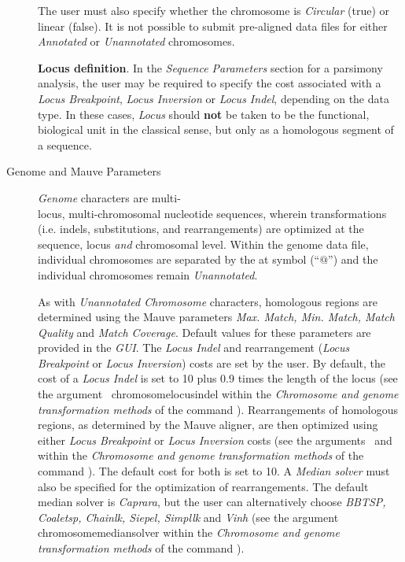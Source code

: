 \begin{description}
		\indent The user must also specify whether the chromosome is \emph{Circular} (true) or linear (false).
		It is not possible to submit pre-aligned data files for either \emph{Annotated} or \emph{Unannotated} 
		chromosomes. 
			
\begin{statement}
    \textbf{Locus definition}. In the \emph{Sequence Parameters} section for a parsimony analysis, the user may be required 
	to specify the cost associated with a \emph{Locus Breakpoint}, \emph{Locus Inversion} or 
	\emph{Locus Indel}, depending on the data type. In these cases, \emph{Locus} should \textbf{not} 
	be taken to be the functional, biological unit in the classical sense, 	but only as a homologous 
	segment of a sequence.
\end{statement}
	
	\item [Genome and Mauve Parameters] \emph{Genome} characters are multi- \\locus, multi-chromosomal nucleotide 
		sequences, wherein transformations (i.e. indels, substitutions, and rearrangements) are optimized 
		at the sequence, locus \emph{and} chromosomal level.  Within the genome data file, individual 
		chromosomes are separated by the at symbol (``$@$'') and the individual chromosomes remain 
		\emph{Unannotated}. 
		
		\indent As with \emph{Unannotated Chromosome} characters, homologous regions are determined 
		using the Mauve parameters \emph{Max. Match, Min. Match, Match Quality} and 
		\emph {Match Coverage}. Default values for these parameters are provided in the \emph{GUI}.
		The \emph{Locus Indel} and rearrangement (\emph{Locus Breakpoint} or \emph{Locus Inversion}) 
		costs are set by the user. By default, the cost of a \emph{Locus Indel} is  set to 10 plus 0.9 times 
		the length of the locus (see the argument~ {chromosomelocusindel}  
		within the \emph{Chromosome and genome transformation methods} of the command 
		).  Rearrangements of homologous regions, as determined  
		by the Mauve aligner, are then optimized using either \emph{Locus Breakpoint} or 
		\emph{Locus Inversion} costs  (see the arguments~ 
		and~ within the \emph{Chromosome 
		and genome transformation methods} of the command ). 
		The default cost for both is set to 10. A \emph{Median solver} must also be specified for the 
		optimization of rearrangements. The default median solver is \emph{Caprara}, 
		but the user can alternatively choose \emph{BBTSP, Coaletsp, 
		Chainlk, Siepel, Simpllk} and \emph{Vinh} (see the argument~
		{chromosomemediansolver} within the \emph{Chromosome and genome transformation 
		methods} of the command ).
		

\end{description}
